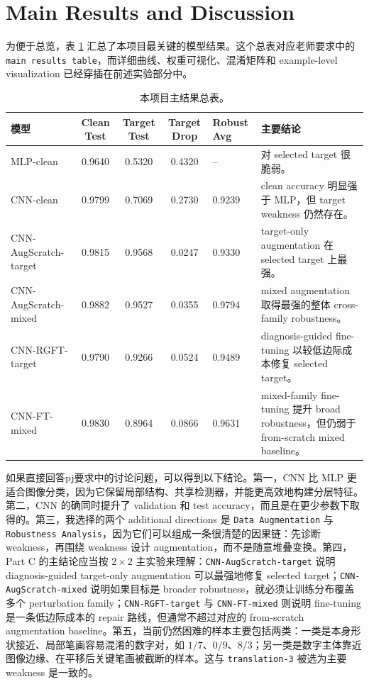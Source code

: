 \documentclass[12pt,a4paper,fontset=fandol]{ctexart}
\begin{document}
\section{Main Results and Discussion}

为便于总览，表 \ref{tab:main_results} 汇总了本项目最关键的模型结果。这个总表对应老师要求中的 \texttt{main results table}，而详细曲线、权重可视化、混淆矩阵和 example-level visualization 已经穿插在前述实验部分中。

\begin{table}[H]
  \centering
  \footnotesize
  \caption{本项目主结果总表。}
  \label{tab:main_results}
  \renewcommand{\arraystretch}{1.12}
  \setlength{\tabcolsep}{3.2pt}
  \begin{tabular}{p{2.55cm}cccp{1.6cm}p{4.2cm}}
    \toprule
    模型 & Clean Test & Target Test & Target Drop & Robust Avg & 主要结论 \\
    \midrule
    MLP-clean & 0.9640 & 0.5320 & 0.4320 & -- & 对 selected target 很脆弱。 \\
    CNN-clean & 0.9799 & 0.7069 & 0.2730 & 0.9239 & clean accuracy 明显强于 MLP，但 target weakness 仍然存在。 \\
    CNN-AugScratch-target & 0.9815 & 0.9568 & 0.0247 & 0.9330 & target-only augmentation 在 selected target 上最强。 \\
    CNN-AugScratch-mixed & 0.9882 & 0.9527 & 0.0355 & 0.9794 & mixed augmentation 取得最强的整体 cross-family robustness。 \\
    CNN-RGFT-target & 0.9790 & 0.9266 & 0.0524 & 0.9489 & diagnosis-guided fine-tuning 以较低边际成本修复 selected target。 \\
    CNN-FT-mixed & 0.9830 & 0.8964 & 0.0866 & 0.9631 & mixed-family fine-tuning 提升 broad robustness，但仍弱于 from-scratch mixed baseline。 \\
    \bottomrule
  \end{tabular}
\end{table}

如果直接回答pj要求中的讨论问题，可以得到以下结论。第一，CNN 比 MLP 更适合图像分类，因为它保留局部结构、共享检测器，并能更高效地构建分层特征。第二，CNN 的确同时提升了 validation 和 test accuracy，而且是在更少参数下取得的。第三，我选择的两个 additional directions 是 \texttt{Data Augmentation} 与 \texttt{Robustness Analysis}，因为它们可以组成一条很清楚的因果链：先诊断 weakness，再围绕 weakness 设计 augmentation，而不是随意堆叠变换。第四，Part C 的主结论应当按 $2 \times 2$ 主实验来理解：\texttt{CNN-AugScratch-target} 说明 diagnosis-guided target-only augmentation 可以最强地修复 selected target；\texttt{CNN-AugScratch-mixed} 说明如果目标是 broader robustness，就必须让训练分布覆盖多个 perturbation family；\texttt{CNN-RGFT-target} 与 \texttt{CNN-FT-mixed} 则说明 fine-tuning 是一条低边际成本的 repair 路线，但通常不超过对应的 from-scratch augmentation baseline。第五，当前仍然困难的样本主要包括两类：一类是本身形状接近、局部笔画容易混淆的数字对，如 $1/7$、$0/9$、$8/3$；另一类是数字主体靠近图像边缘、在平移后关键笔画被截断的样本。这与 \texttt{translation-3} 被选为主要 weakness 是一致的。
\end{document}
